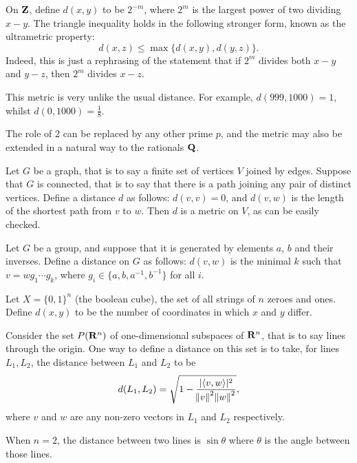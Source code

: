\begin{example}
On $\mathbf Z$, define $d(x,y)$ to be $2^{-m}$, where $2^m$ is the largest power of two dividing $x-y$. The triangle inequality holds in the following stronger form, known as the ultrametric property:
\[d(x,z)\le\max\{d(x,y),d(y,z)\}.\]
Indeed, this is just a rephrasing of the statement that if $2^m$ divides both $x-y$ and $y-z$, then $2^m$ divides $x-z$.

This metric is very unlike the usual distance. For example, $d(999,1000) = 1$, whilst $d(0,1000)=\frac{1}{8}$.

The role of $2$ can be replaced by any other prime $p$, and the metric may also be
extended in a natural way to the rationals $\mathbf Q$.
\end{example}

\begin{example}
Let $G$ be a graph, that is to say a finite set of vertices $V$ joined by edges. Suppose that $G$ is connected, that is to say that there is a path joining any pair of distinct vertices. Define a distance $d$ as follows: $d(v,v)=0$, and $d(v,w)$ is the length of the shortest path from $v$ to $w$. Then $d$ is a metric on $V$, as can be easily checked.
\end{example}

\begin{example}
Let $G$ be a group, and suppose that it is generated by elements $a$, $b$ and their inverses. Define a distance on $G$ as follows: $d(v,w)$ is the minimal $k$ such that $v=wg_1\cdots g_k$, where $g_i\in\{a,b,a^{-1},b^{-1}\}$ for all $i$.
\end{example}

\begin{example}
Let $X=\{0,1\}^n$ (the boolean cube), the set of all strings of $n$ zeroes and ones. Define $d(x,y)$ to be the number of coordinates
in which $x$ and $y$ differ.
\end{example}

\begin{example}
Consider the set $P(\mathbf R^n)$ of one-dimensional subspaces of $\mathbf R^n$, that is to say lines through the origin. One way to define a distance on this set is to take, for lines $L_1,L_2$, the distance between $L_1$ and $L_2$ to be
\[d(L_1,L_2)=\sqrt{1-\frac{|\langle v,w\rangle|^2}{\norm{v}^2\norm{w}^2}},\]
where $v$ and $w$ are any non-zero vectors in $L_1$ and $L_2$ respectively.

When $n=2$, the distance between two lines is $\sin\theta$ where $\theta$ is the angle between those lines.
\end{example}


